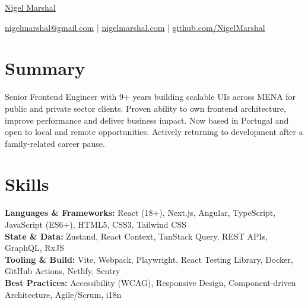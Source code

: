 \documentclass[10pt,letterpaper]{article}
\begin{document}

\centerline{\Huge \href{https://nigelmarshal.com}{Nigel Marshal}}

\vspace{5pt}


\centerline{\href{mailto:nigelmarshal@gmail.com}{nigelmarshal@gmail.com} | \href{https://nigelmarshal.com}{nigelmarshal.com} | \href{https://github.com/NigelMarshal}{github.com/NigelMarshal}}

\vspace{-10pt}
\section*{Summary}
Senior Frontend Engineer with 9+ years building scalable UIs across MENA for public and private sector clients. Proven ability to own frontend architecture, improve performance and deliver business impact. Now based in Portugal and open to local and remote opportunities. Actively returning to development after a family-related career pause.
\vspace{-9.5pt}


\section*{Skills}
\textbf{Languages \& Frameworks:} React (18+), Next.js, Angular, TypeScript, JavaScript (ES6+), HTML5, CSS3, Tailwind CSS \\
\textbf{State \& Data:} Zustand, React Context, TanStack Query, REST APIs, GraphQL, RxJS \\
\textbf{Tooling \& Build:} Vite, Webpack, Playwright, React Testing Library, Docker, GitHub Actions, Netlify, Sentry \\
\textbf{Best Practices:} Accessibility (WCAG), Responsive Design, Component-driven Architecture, Agile/Scrum, i18n
\vspace{-9.5pt}
\end{document}
